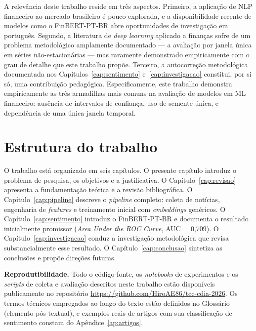 A relevância deste trabalho reside em três aspectos. Primeiro, a aplicação de NLP financeiro ao mercado brasileiro é pouco explorada, e a disponibilidade recente de modelos como o FinBERT-PT-BR abre oportunidades de investigação em português. Segundo, a literatura de \textit{deep learning} aplicado a finanças sofre de um problema metodológico amplamente documentado --- a avaliação por janela única em séries não-estacionárias \cite{bailey2014,lopezdeprado2018} --- mas raramente demonstrado empiricamente com o grau de detalhe que este trabalho propõe. Terceiro, a autocorreção metodológica documentada nos Capítulos~\ref{cap:sentimento} e~\ref{cap:investigacao} constitui, por si só, uma contribuição pedagógica. Especificamente, este trabalho demonstra empiricamente as três armadilhas mais comuns na avaliação de modelos em ML financeiro: ausência de intervalos de confiança, uso de semente única, e dependência de uma única janela temporal.

\section{Estrutura do trabalho}

O trabalho está organizado em seis capítulos. O presente capítulo introduz o problema de pesquisa, os objetivos e a justificativa. O Capítulo~\ref{cap:revisao} apresenta a fundamentação teórica e a revisão bibliográfica. O Capítulo~\ref{cap:pipeline} descreve o \textit{pipeline} completo: coleta de notícias, engenharia de \textit{features} e treinamento inicial com \textit{embeddings} genéricos. O Capítulo~\ref{cap:sentimento} introduz o FinBERT-PT-BR e documenta o resultado inicialmente promissor (\textit{Area Under the ROC Curve}, AUC = 0,709). O Capítulo~\ref{cap:investigacao} conduz a investigação metodológica que revisa substancialmente esse resultado. O Capítulo~\ref{cap:conclusao} sintetiza as conclusões e propõe direções futuras.

\textbf{Reprodutibilidade.} Todo o código-fonte, os \textit{notebooks} de experimentos e os \textit{scripts} de coleta e avaliação descritos neste trabalho estão disponíveis publicamente no repositório \url{https://github.com/HiroAE86/tcc-cdia-2026}. Os termos técnicos empregados ao longo do texto estão definidos no Glossário (elemento pós-textual), e exemplos reais de artigos com sua classificação de sentimento constam do Apêndice~\ref{ap:artigos}.


